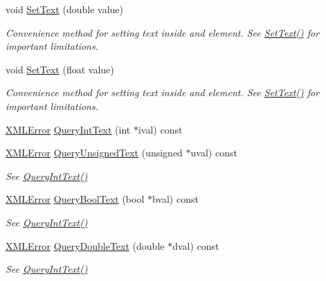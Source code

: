 \begin{DoxyCompactItemize}
void \hyperlink{classtinyxml2_1_1_x_m_l_element_a67bd77ac9aaeff58ff20b4275a65ba4e}{Set\+Text} (double value)
\begin{DoxyCompactList}\small\item\em Convenience method for setting text inside and element. See \hyperlink{classtinyxml2_1_1_x_m_l_element_a1f9c2cd61b72af5ae708d37b7ad283ce}{Set\+Text()} for important limitations. \end{DoxyCompactList}\item 
void \hyperlink{classtinyxml2_1_1_x_m_l_element_a51d560da5ae3ad6b75e0ab9ffb2ae42a}{Set\+Text} (float value)
\begin{DoxyCompactList}\small\item\em Convenience method for setting text inside and element. See \hyperlink{classtinyxml2_1_1_x_m_l_element_a1f9c2cd61b72af5ae708d37b7ad283ce}{Set\+Text()} for important limitations. \end{DoxyCompactList}\item 
\hyperlink{namespacetinyxml2_a1fbf88509c3ac88c09117b1947414e08}{X\+M\+L\+Error} \hyperlink{classtinyxml2_1_1_x_m_l_element_a71327c9a9d8840562bd204f46d0a7189}{Query\+Int\+Text} (int $\ast$ival) const 
\item 
\hyperlink{namespacetinyxml2_a1fbf88509c3ac88c09117b1947414e08}{X\+M\+L\+Error} \hyperlink{classtinyxml2_1_1_x_m_l_element_a2192091dec0c06be8b14f4e912c01758}{Query\+Unsigned\+Text} (unsigned $\ast$uval) const 
\begin{DoxyCompactList}\small\item\em See \hyperlink{classtinyxml2_1_1_x_m_l_element_a71327c9a9d8840562bd204f46d0a7189}{Query\+Int\+Text()} \end{DoxyCompactList}\item 
\hyperlink{namespacetinyxml2_a1fbf88509c3ac88c09117b1947414e08}{X\+M\+L\+Error} \hyperlink{classtinyxml2_1_1_x_m_l_element_afeb060672fa934163fc573e692b7fe38}{Query\+Bool\+Text} (bool $\ast$bval) const 
\begin{DoxyCompactList}\small\item\em See \hyperlink{classtinyxml2_1_1_x_m_l_element_a71327c9a9d8840562bd204f46d0a7189}{Query\+Int\+Text()} \end{DoxyCompactList}\item 
\hyperlink{namespacetinyxml2_a1fbf88509c3ac88c09117b1947414e08}{X\+M\+L\+Error} \hyperlink{classtinyxml2_1_1_x_m_l_element_aad931c42548907dbea416f7365d78b57}{Query\+Double\+Text} (double $\ast$dval) const 
\begin{DoxyCompactList}\small\item\em See \hyperlink{classtinyxml2_1_1_x_m_l_element_a71327c9a9d8840562bd204f46d0a7189}{Query\+Int\+Text()} \end{DoxyCompactList}\item 

\end{DoxyCompactItemize}

